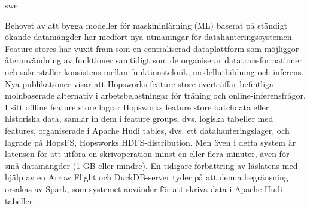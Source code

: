 \markboth{\abstractname}{}
\begin{scontents}[store-env=lang]
swe
\end{scontents}
\begin{scontents}[store-env=abstracts,print-env=true]
Behovet av att bygga modeller för maskininlärning (ML) baserat på ständigt ökande datamängder har medfört nya utmaningar för datahanteringssystemen. Feature stores har vuxit fram som en centraliserad dataplattform som möjliggör återanvändning av funktioner samtidigt som de organiserar datatransformationer och säkerställer konsistens mellan funktionsteknik, modellutbildning och inferens. Nya publikationer visar att Hopsworks feature store överträffar befintliga molnbaserade alternativ i arbetsbelastningar för träning och online-inferensfrågor. I sitt offline feature store lagrar Hopsworks feature store batchdata eller historiska data, samlar in dem i feature groups, dvs. logiska tabeller med features, organiserade i Apache Hudi tables, dvs. ett datahanteringslager, och lagrade på HopsFS, Hopsworks HDFS-distribution. Men även i detta system är latensen för att utföra en skrivoperation minst en eller flera minuter, även för små datamängder (1 GB eller mindre). En tidigare förbättring av läslatens med hjälp av en Arrow Flight och DuckDB-server tyder på att denna begränsning orsakas av Spark, som systemet använder för att skriva data i Apache Hudi-tabeller. 

\end{scontents}
